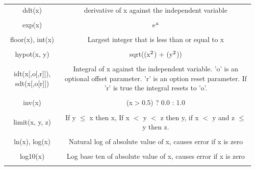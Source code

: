 \begin{longtable}{c c}
ddt(x) & \begin{minipage}{20em}
derivative of x against the independent variable
\end{minipage}\\ \\

exp(x) & \begin{minipage}{20em}
e$\rm{^x}$
\end{minipage}\\ \\

floor(x), int(x) & \begin{minipage}{20em}
Largest integer that is less than or equal to x
\end{minipage}\\ \\

hypot(x, y) & \begin{minipage}{20em}
sqrt((x$\rm{^2}$) + (y$\rm{^2}$))
\end{minipage}\\ \\

idt(x[,o[,r]]), sdt(x[,o[r]]) & \begin{minipage}{20em}
Integral of x against the independent variable. 'o' is an optional offset parameter. 'r' is an option reset parameter. If 'r' is true the integral resets to 'o'.
\end{minipage}\\ \\

inv(x) & \begin{minipage}{20em}
(x$>$0.5) ? 0.0 : 1.0
\end{minipage}\\ \\

limit(x, y, z) & \begin{minipage}{20em}
If y $\leq$ x then x, If x $<$ y $<$ z then y, if x $<$ y and z $\leq$ y then z.  
\end{minipage}\\ \\

ln(x), log(x) & \begin{minipage}{20em}
Natural log of absolute value of x, causes error if x is zero
\end{minipage}\\ \\

log10(x) & \begin{minipage}{20em}
Log base ten of absolute value of x, causes error if x is zero
\end{minipage}\\ \\


\end{longtable}
